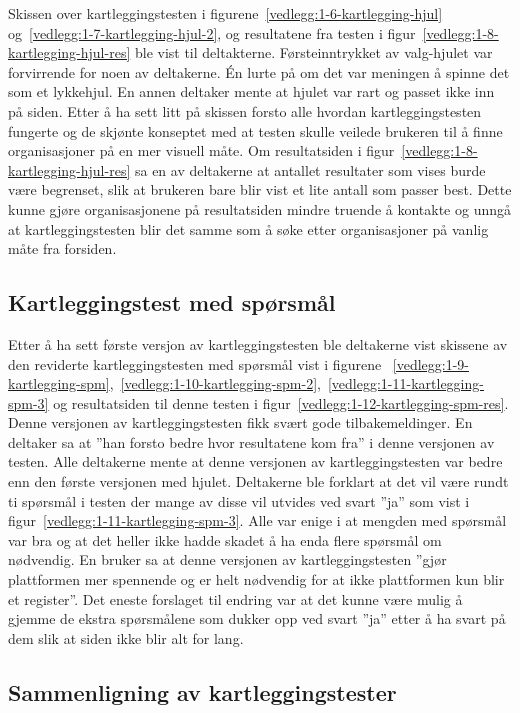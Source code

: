 Skissen over kartleggingstesten i figurene~\ref{vedlegg:1-6-kartlegging-hjul} og~\ref{vedlegg:1-7-kartlegging-hjul-2}, og resultatene fra testen i figur~\ref{vedlegg:1-8-kartlegging-hjul-res} ble vist til deltakterne. Førsteinntrykket av valg-hjulet var forvirrende for noen av deltakerne. Én lurte på om det var meningen å spinne det som et lykkehjul. En annen deltaker mente at hjulet var rart og passet ikke inn på siden. Etter å ha sett litt på skissen forsto alle hvordan kartleggingstesten fungerte og de skjønte konseptet med at testen skulle veilede brukeren til å finne organisasjoner på en mer visuell måte. Om resultatsiden i figur~\ref{vedlegg:1-8-kartlegging-hjul-res} sa en av deltakerne at antallet resultater som vises burde være begrenset, slik at brukeren bare blir vist et lite antall som passer best. Dette kunne gjøre organisasjonene på resultatsiden mindre truende å kontakte og unngå at kartleggingstesten blir det samme som å søke etter organisasjoner på vanlig måte fra forsiden.


\subsection{Kartleggingstest med spørsmål}

Etter å ha sett første versjon av kartleggingstesten ble deltakerne vist skissene av den reviderte kartleggingstesten med spørsmål vist i figurene ~\ref{vedlegg:1-9-kartlegging-spm},~\ref{vedlegg:1-10-kartlegging-spm-2},~\ref{vedlegg:1-11-kartlegging-spm-3} og resultatsiden til denne testen i figur~\ref{vedlegg:1-12-kartlegging-spm-res}. Denne versjonen av kartleggingstesten fikk svært gode tilbakemeldinger. En deltaker sa at ''han forsto bedre hvor resultatene kom fra'' i denne versjonen av testen. Alle deltakerne mente at denne versjonen av kartleggingstesten var bedre enn den første versjonen med hjulet. Deltakerne ble forklart at det vil være rundt ti spørsmål i testen der mange av disse vil utvides ved svart ''ja'' som vist i figur~\ref{vedlegg:1-11-kartlegging-spm-3}. Alle var enige i at mengden med spørsmål var bra og at det heller ikke hadde skadet å ha enda flere spørsmål om nødvendig. En bruker sa at denne versjonen av kartleggingstesten ''gjør plattformen mer spennende og er helt nødvendig for at ikke plattformen kun blir et register''. Det eneste forslaget til endring var at det kunne være mulig å gjemme de ekstra spørsmålene som dukker opp ved svart ''ja'' etter å ha svart på dem slik at siden ikke blir alt for lang.


\subsection{Sammenligning av kartleggingstester}

